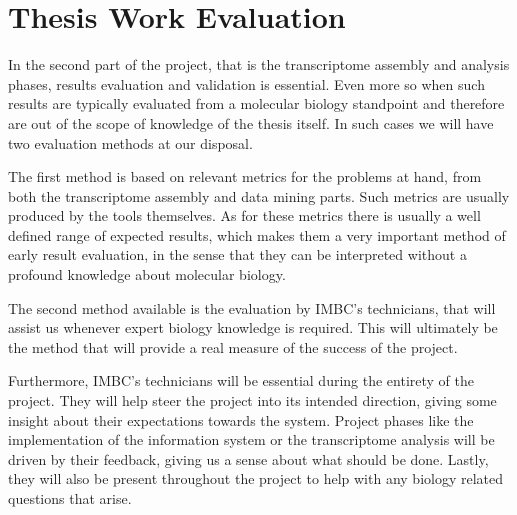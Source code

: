 \section{Thesis Work Evaluation}\label{sec:eval}

In the second part of the project, that is the transcriptome assembly and
analysis phases, results evaluation and validation is essential. Even more so
when such results are typically evaluated from a molecular biology standpoint and
therefore are out of the scope of knowledge of the thesis itself. In such cases
we will have two evaluation methods at our disposal.

The first method is based on relevant metrics for the problems at hand, from
both the transcriptome assembly and data mining parts. Such metrics are usually
produced by the tools themselves. As for these metrics there is usually a well
defined range of expected results, which makes them a very important method of early
result evaluation, in the sense that they can be interpreted without a profound
knowledge about molecular biology.

The second method available is the evaluation by IMBC's technicians, that will
assist us whenever expert biology knowledge is required. This will ultimately be
the method that will provide a real measure of the success of the project.

Furthermore, IMBC's technicians will be essential during the entirety of the project. They
will help steer the project into its intended direction, giving some insight
about their expectations towards the system. Project phases like the
implementation of the information system or the transcriptome analysis will be
driven by their feedback, giving us a sense about what should be done. Lastly,
they will also be present throughout the project to help with any biology
related questions that arise.



